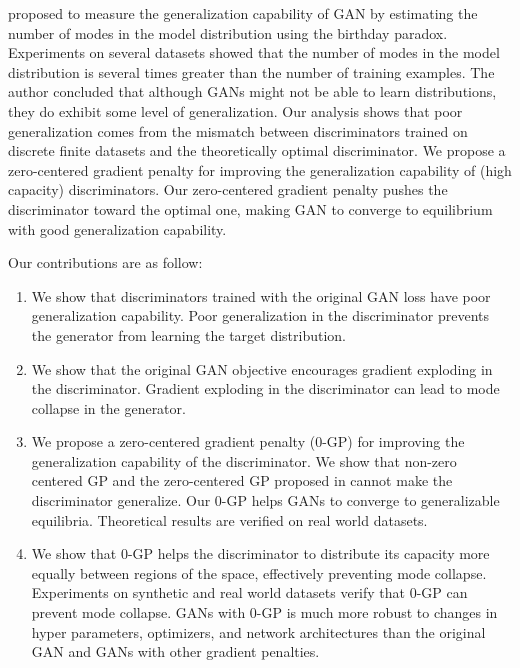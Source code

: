 \documentclass{article} %
\begin{document}
\cite{doGANLearnDist} proposed to measure the generalization capability of GAN by estimating the number of modes in the model distribution using the birthday paradox. Experiments on several datasets showed that the number of modes in the model distribution is several times greater than the number of training examples. The author concluded that although GANs might not be able to learn distributions, they do exhibit some level of generalization. Our analysis shows that poor generalization comes from the mismatch between discriminators trained on discrete finite datasets and the theoretically optimal discriminator. We propose a zero-centered gradient penalty for improving the generalization capability of (high capacity) discriminators. Our zero-centered gradient penalty pushes the discriminator toward the optimal one, making GAN to converge to equilibrium with good generalization capability. 



Our contributions are as follow:
\begin{enumerate}
\item We show that discriminators trained with the original GAN loss have poor generalization capability. Poor generalization in the discriminator prevents the generator from learning the target distribution. 
\item We show that the original GAN objective encourages gradient exploding in the discriminator. Gradient exploding in the discriminator can lead to mode collapse in the generator. %
\item We propose a zero-centered gradient penalty (0-GP) for improving the generalization capability of the discriminator. We show that non-zero centered GP and the zero-centered GP proposed in \cite{whichGANConverge} cannot make the discriminator generalize. Our 0-GP helps GANs to converge to generalizable equilibria. Theoretical results are verified on real world datasets.
\item We show that 0-GP helps the discriminator to distribute its capacity more equally between regions of the space, effectively preventing mode collapse. Experiments on synthetic and real world datasets verify that 0-GP can prevent mode collapse. GANs with 0-GP is much more robust to changes in hyper parameters, optimizers, and network architectures than the original GAN and GANs with other gradient penalties.
\end{enumerate}
\end{document}

